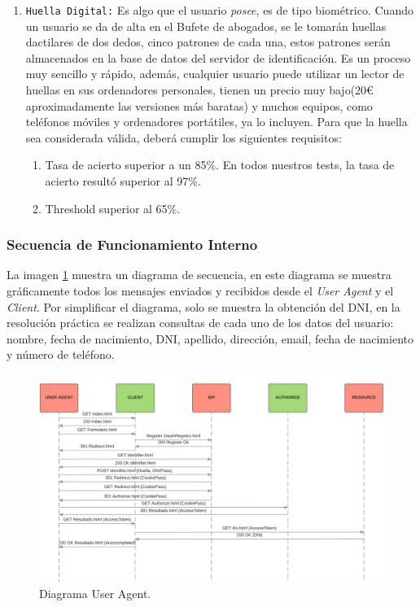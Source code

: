 \documentclass[a4,12pt,onecolum]{article}
\begin{document}
\begin{enumerate}
	\item \texttt{Huella Digital:} Es algo que el usuario \emph{posee}, es de tipo biométrico. Cuando un 			usuario se da de alta en el Bufete de abogados, se le tomarán huellas dactilares de dos dedos, cinco 			patrones de cada una, estos patrones serán almacenados en la base de datos del servidor de identificación. 		Es un proceso muy sencillo y rápido, además, cualquier usuario puede utilizar un lector de huellas en sus 		ordenadores personales, tienen un precio muy bajo(20\euro{} aproximadamente las versiones más baratas) y 		muchos equipos, como teléfonos móviles y ordenadores portátiles, ya lo incluyen.
	Para que la huella sea considerada válida, deberá cumplir los siguientes requisitos:
	\begin{enumerate}
		\item Tasa de acierto superior a un 85\%. En todos nuestros tests, la tasa de acierto resultó superior 			al 97\%.
		\item Threshold superior al 65\%.
	\end{enumerate}

\end{enumerate}


\subsubsection{Secuencia de Funcionamiento Interno}
La imagen \ref{fig:oauth2} muestra un diagrama de secuencia, en este diagrama se muestra gráficamente todos los mensajes enviados y recibidos desde el \emph{User Agent} y el \emph{Client}. Por simplificar el diagrama, solo se muestra la obtención del DNI, en la resolución práctica se realizan consultas de cada uno de los datos del usuario: nombre, fecha de nacimiento, DNI, apellido, dirección, email, fecha de nacimiento y número de teléfono.

\begin{figure}[htbp]
\centering
\includegraphics[width=1.1\textwidth]{./images/oauth/diagrama_flujo_useragent.png}
\caption{Diagrama User Agent.}
\label{fig:oauth2}
\end{figure}
\end{document}
